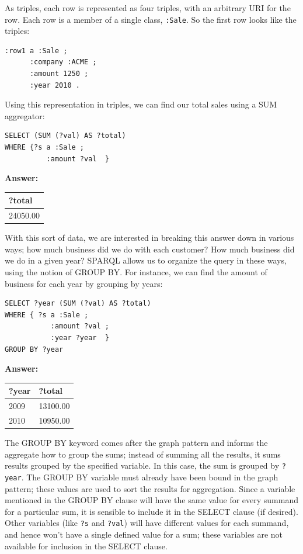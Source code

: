 As triples, each row is represented as four triples, with an arbitrary
URI for the row. Each row is a member of a single class, \texttt{:Sale}. So the
first row looks like the triples:

\begin{lstlisting}
:row1 a :Sale ;
      :company :ACME ;
      :amount 1250 ;
      :year 2010 .
\end{lstlisting}

Using this representation in triples, we can find our total sales using
a SUM aggregator:


\begin{lstlisting}
SELECT (SUM (?val) AS ?total)
WHERE {?s a :Sale ;
          :amount ?val  }
\end{lstlisting}

\textbf{\textbf{Answer:}}

\begin{tabular}{|l|}
\hline
?total\\
\hline
24050.00\\
\hline
\end{tabular}

With this sort of data, we are interested in breaking this answer down
in various ways; how much business did we do with each customer? How
much business did we do in a given year? SPARQL allows us to organize
the query in these ways, using the notion of GROUP BY. For instance, we
can find the amount of business for each year by grouping by years:


\begin{lstlisting}
SELECT ?year (SUM (?val) AS ?total)
WHERE { ?s a :Sale ;
           :amount ?val ;
           :year ?year  }
GROUP BY ?year
\end{lstlisting}

\textbf{\textbf{Answer:}}

\begin{tabular}{|ll|}
\hline
?year&?total\\
\hline
2009&13100.00\\
2010&10950.00\\
\hline
\end{tabular}

The GROUP BY keyword comes after the graph pattern and informs the
aggregate how to group the sums; instead of summing all the results, it
sums results grouped by the specified variable. In this case, the sum is
grouped by \texttt{?year}. The GROUP BY variable must already have been bound in
the graph pattern; these values are used to sort the results for
aggregation. Since a variable mentioned in the GROUP BY clause will have
the same value for every summand for a particular sum, it is sensible to
include it in the SELECT clause (if desired). Other variables (like \texttt{?s}
and \texttt{?val}) will have different values for each summand, and hence won't
have a single defined value for a sum; these variables are not available
for inclusion in the SELECT clause.

